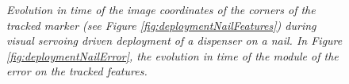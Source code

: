 \begin{figure}
	\centering
	\caption{\textit{Evolution in time of the image coordinates of the corners of the tracked marker (see Figure \ref{fig:deploymentNailFeatures}) during visual servoing driven deployment of a dispenser on a nail. In Figure \ref{fig:deploymentNailError}, the evolution in time of the module of the error on the tracked features.}}
	\label{fig:deploymentNailResult}
\end{figure}


